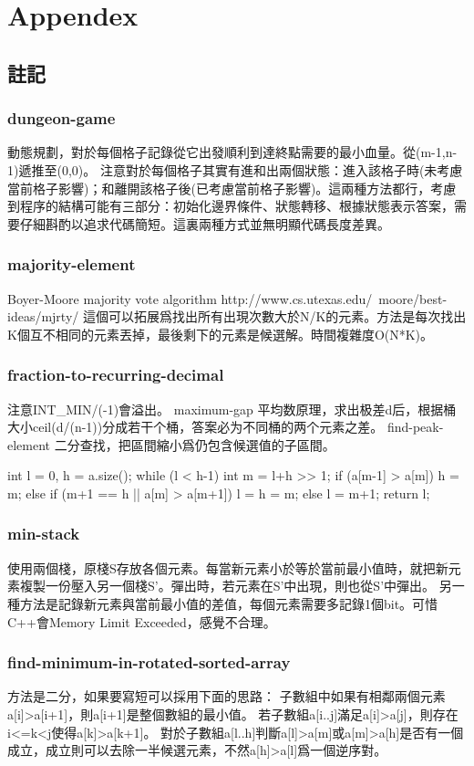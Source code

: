 \chapter{Appendex}

\section{註記} %

\subsection{dungeon-game}
動態規劃，對於每個格子記錄從它出發順利到達終點需要的最小血量。從(m-1,n-1)遞推至(0,0)。
注意對於每個格子其實有進和出兩個狀態：進入該格子時(未考慮當前格子影響)；和離開該格子後(已考慮當前格子影響)。這兩種方法都行，考慮到程序的結構可能有三部分：初始化邊界條件、狀態轉移、根據狀態表示答案，需要仔細斟酌以追求代碼簡短。這裏兩種方式並無明顯代碼長度差異。
\subsection{majority-element}
Boyer-Moore majority vote algorithm http://www.cs.utexas.edu/~moore/best-ideas/mjrty/ 
這個可以拓展爲找出所有出現次數大於N/K的元素。方法是每次找出K個互不相同的元素丟掉，最後剩下的元素是候選解。時間複雜度O(N*K)。
\subsection{fraction-to-recurring-decimal}

注意INT_MIN/(-1)會溢出。
maximum-gap
平均数原理，求出极差d后，根据桶大小ceil(d/(n-1))分成若干个桶，答案必为不同桶的两个元素之差。
find-peak-element
二分查找，把區間縮小爲仍包含候選值的子區間。
\begin{Code}
	int l = 0, h = a.size();
	while (l < h-1) {
		int m = l+h >> 1;
		if (a[m-1] > a[m]) h = m;
		else if (m+1 == h || a[m] > a[m+1]) l = h = m;
		else l = m+1;
	}
	return l;
\end{Code}
\subsection{min-stack}
使用兩個棧，原棧S存放各個元素。每當新元素小於等於當前最小值時，就把新元素複製一份壓入另一個棧S'。彈出時，若元素在S'中出現，則也從S'中彈出。
另一種方法是記錄新元素與當前最小值的差值，每個元素需要多記錄1個bit。可惜C++會Memory Limit Exceeded，感覺不合理。
\subsection{find-minimum-in-rotated-sorted-array}
方法是二分，如果要寫短可以採用下面的思路： 子數組中如果有相鄰兩個元素a[i]>a[i+1]，則a[i+1]是整個數組的最小值。 若子數組a[i..j]滿足a[i]>a[j]，則存在i<=k<j使得a[k]>a[k+1]。 
對於子數組a[l..h]判斷a[l]>a[m]或a[m]>a[h]是否有一個成立，成立則可以去除一半候選元素，不然a[h]>a[l]爲一個逆序對。
